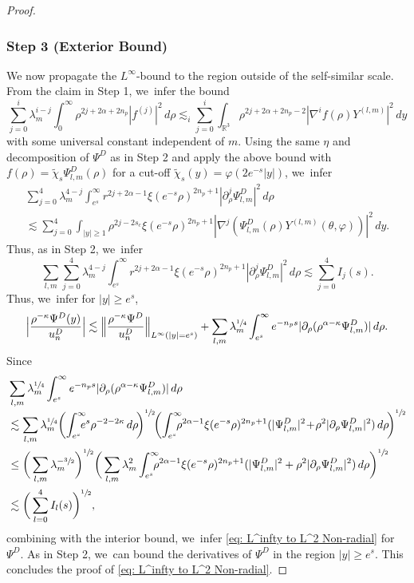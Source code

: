 \documentclass[10pt]{amsart}
\theoremstyle{plain}
\theoremstyle{definition}
\begin{document}
\begin{proof}
\subsubsection*{Step 3 (Exterior Bound)}
We now propagate the $L^\infty$-bound to the region outside of the self-similar scale. From the claim in Step 1, we~infer the bound\vspace*{-3pt}
\[
\sum_{j=0}^i\lambda_m^{i-j}\int_0^\infty \rho^{2j+2\alpha+2n_p}|f^{(j)}|^2\,d\rho\lesssim_i\sum_{j=0}^i\int_{\mathbb R^3}\rho^{2j+2\alpha+2n_p-2}|\nabla^i f(\rho)Y^{(l,m)}|^2\,dy
\]
with some universal constant independent of $m$. Using the same $\eta$ and decomposition of $\Psi^D$ as in Step 2 and apply the above bound with $f(\rho)=\tilde \chi_s\Psi_{l,m}^D(\rho)$ for a cut-off $\tilde \chi_s(y)=\varphi(2e^{-s}|y|)$, we~infer\vspace*{-5pt}
\begin{multline*}
\sum_{j=0}^{4}\lambda_m^{4-j}\int_{e^s}^\infty r^{2j+2\alpha-1}\xi(e^{-s}\rho)^{2n_p+1}|\partial_\rho^j \Psi_{l,m}^D|^2\,d\rho\\[-5pt]
\lesssim \sum_{j=0}^4\int_{|y|\ge1}\rho^{2j-2s_c}\xi(e^{-s}\rho)^{2n_p+1}|\nabla^j(\Psi_{l,m}^D(\rho)Y^{(l,m)}(\theta,\varphi))|^2\,dy.
\end{multline*}
Thus, as in Step 2, we~infer\vspace*{-3pt}
\[
\sum_{l,m}\sum_{j=0}^{4}\lambda_m^{4-j}\int_{e^s}^\infty r^{2j+2\alpha-1}\xi(e^{-s}\rho)^{2n_p+1}|\partial_\rho^j \Psi_{l,m}^D|^2\,d\rho\lesssim\sum_{j=0}^4I_j(s).
\]
Thus, we~infer for $|y|\ge e^s$,\vspace*{-3pt}
\[
\Big|\frac{\rho^{-\kappa}\Psi^D(y)}{u_n^D}\Big|\lesssim \Big\Vert \frac{\rho^{-\kappa}\Psi^D}{u_n^D}\Big\Vert_{L^\infty(|y|=e^s)}+\sum_{l,m}\lambda_m^{\sfrac{1}{4}}\int_{e^s}^\infty e^{-n_ps}|\partial_\rho(\rho^{\alpha-\kappa}\Psi_{l,m}^D)|\,d\rho.
\]
Since
\[
\begin{aligned}
&\sum_{l,m}\lambda_m^{\sfrac{1}{4}}\int_{e^s}^\infty e^{-n_ps}|\partial_\rho(\rho^{\alpha-\kappa}\Psi_{l,m}^D)|\,d\rho\\[-3pt]
&\lesssim\sum_{l,m}\lambda_m^{\sfrac{1}{4}}\bigg(\!\int_{e^s}^\infty\hspace*{-2.5mm} e^s\rho^{-2-2\kappa}\,d\rho\!\bigg)^{\sfrac{1}{2}}\!\bigg(\!\int_{e^s}^\infty\hspace*{-2.5mm}\rho^{2\alpha-1}\xi(e^{-s}\rho)^{2n_p+1}(|\Psi_{l,m}^D|^2\!+\!\rho^2|\partial_\rho\Psi_{l,m}^D|^2)\,d\rho\!\bigg)^{\sfrac{1}{2}}\\
&\le \bigg(\sum_{l,m} \lambda_m^{-\sfrac{3}{2}}\bigg)^{\sfrac{1}{2}}\bigg(\sum_{l,m}\lambda_m^2\int_{e^s}^\infty\hspace*{-2.5mm} \rho^{2\alpha-1}\xi(e^{-s}\rho)^{2n_p+1}(|\Psi_{l,m}^D|^2+\rho^2|\partial_\rho\Psi_{l,m}^D|^2)\,d\rho\bigg)^{\sfrac{1}{2}}\\
&\lesssim \bigg(\sum_{l=0}^4I_l(s)\bigg)^{\sfrac{1}{2}},
\end{aligned}
\]
combining with the interior bound, we~infer \eqref{eq: L^infty to L^2 Non-radial} for $\Psi^D$. As in Step 2, we~can bound the derivatives of $\Psi^D$ in the region $|y|\ge e^s$. This concludes the proof of \eqref{eq: L^infty to L^2 Non-radial}.
\end{proof}
\end{document}
